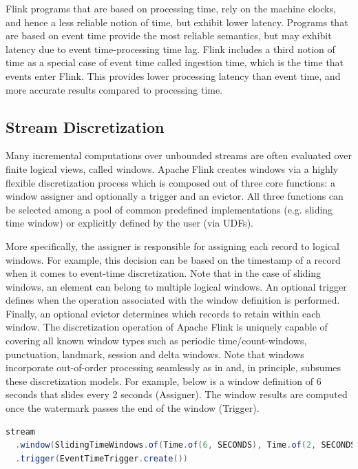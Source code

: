 Flink programs that are based on processing time, rely on the machine clocks, and hence a less reliable notion of time, but exhibit lower latency. Programs that are based on event time provide the most reliable semantics, but may exhibit latency due to event time-processing time lag. Flink includes a third notion of time as a special case of event time called ingestion time, which is the time that events enter Flink. This provides  lower processing latency than event time, and more accurate results compared to processing time.


\subsection{Stream Discretization}
Many incremental computations over unbounded streams are often evaluated over finite logical views, called windows. Apache Flink creates windows via a highly flexible discretization process which is composed out of three core functions: a window assigner and optionally a trigger and an evictor. All three functions can be selected among a pool of common predefined implementations (e.g. sliding time window) or explicitly defined by the user (via UDFs).

More specifically, the assigner is responsible for assigning each record to logical windows. For example, this decision can be based on the timestamp of a record when it comes to event-time discretization. Note that in the case of sliding windows, an element can belong to multiple logical windows. An optional trigger defines when the operation associated with the window definition is performed. Finally, an optional evictor determines which records to retain within each window. The discretization operation of Apache Flink is uniquely capable of covering all known window types such as periodic time/count-windows, punctuation, landmark, session and delta windows. Note that windows incorporate out-of-order processing seamlessly as in \cite{li2005semantics, akidau2015dataflow} and, in principle, subsumes these discretization models. For example, below is a window definition of 6 seconds that slides every 2 seconds (Assigner). The window results are computed once the watermark passes the end of the window (Trigger).

\begin{lstlisting}[language=Scala]
stream
  .window(SlidingTimeWindows.of(Time.of(6, SECONDS), Time.of(2, SECONDS))
  .trigger(EventTimeTrigger.create())
\end{lstlisting}

